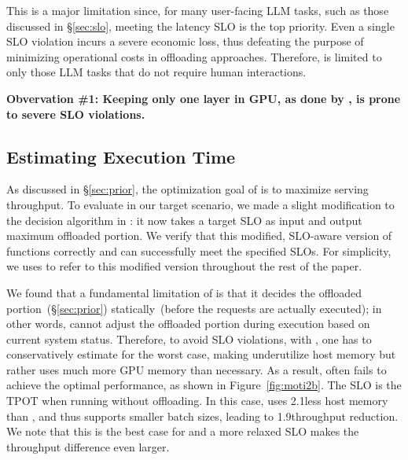 This is a major limitation since, for many user-facing LLM tasks, such as those discussed in \S\ref{sec:slo}, meeting the latency SLO is the top priority. 
%
Even a single SLO violation incurs a severe economic loss, thus defeating the purpose of minimizing operational costs in offloading approaches. 
%
Therefore, \deepspeed is limited to only those LLM tasks that do not require human interactions. 


\noindent \textbf{Obvervation \#1: Keeping only one layer in GPU, as done by \deepspeed, 
is prone to severe SLO violations.}





\subsection{Estimating Execution Time}
\label{sec:estimating}



As discussed in \S\ref{sec:prior}, the optimization goal of \flexgen is to 
maximize serving throughput. 
%
To evaluate \flexgen in our target scenario, we made a slight modification to 
the decision algorithm in \flexgen: it now takes a target SLO as input 
and output maximum offloaded portion. 
%
We verify that this modified, SLO-aware version of \flexgen functions correctly and can successfully meet the specified SLOs. 
%
For simplicity, we uses \flexgen to refer to this modified version throughout the rest of the paper. 

We found that a fundamental limitation of \flexgen is that it decides 
the offloaded portion~(\S\ref{sec:prior}) statically~(before 
the requests are actually executed); 
in other words, \flexgen cannot adjust the offloaded portion during execution based on current system status. 
%
Therefore, to avoid SLO violations, with \flexgen, one has to conservatively estimate for the worst case, making \flexgen underutilize host memory but rather uses much more GPU memory than necessary. 
%
As a result, \flexgen often fails to achieve the optimal performance, as shown in Figure~\ref{fig:moti2b}.  
%
The SLO is the TPOT when running without offloading. 
%
In this case, \flexgen uses 2.1\X less host memory than \sys, and thus supports smaller batch sizes, leading to 1.9\X throughput reduction. 
%
We note that this is the best case for \flexgen and a more relaxed SLO 
makes the throughput difference even larger. 

